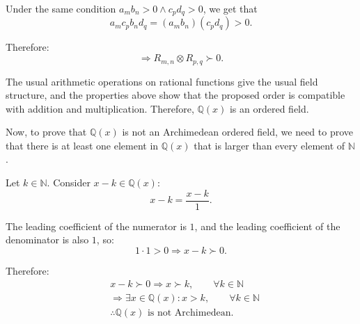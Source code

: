 \begin{solution}
\begin{enumerate}[label=\roman*)]
Under the same condition $a_mb_n > 0 \land c_pd_q > 0$, we get that
$$a_mc_pb_nd_q=(a_mb_n)(c_pd_q)>0.$$

Therefore:
$$\Rightarrow R_{m,n} \otimes R_{p,q} \succ 0.$$

\end{enumerate}

The usual arithmetic operations on rational functions give the usual field structure, and the properties above show that the proposed order is compatible with addition and multiplication. Therefore, $\mathbb{Q}(x)$ is an ordered field.

Now, to prove that $\mathbb{Q}(x)$ is not an Archimedean ordered field, we need to prove that there is at least one element in $\mathbb{Q}(x)$ that is larger than every element of $\mathbb{N}$.

Let $k\in\mathbb{N}$. Consider $x-k\in\mathbb{Q}(x)$:
$$x-k=\frac{x-k}{1}.$$

The leading coefficient of the numerator is $1$, and the leading coefficient of the denominator is also $1$, so:
$$1\cdot1>0 \Rightarrow x-k\succ0.$$

Therefore:
\begin{align*}
&x-k\succ0 \Rightarrow x\succ k,\qquad \forall k\in\mathbb{N}\\
&\Rightarrow \exists x\in\mathbb{Q}(x): x>k,\qquad \forall k\in\mathbb{N}\\
&\therefore \mathbb{Q}(x)\text{ is not Archimedean}.
\end{align*}
\end{solution}
